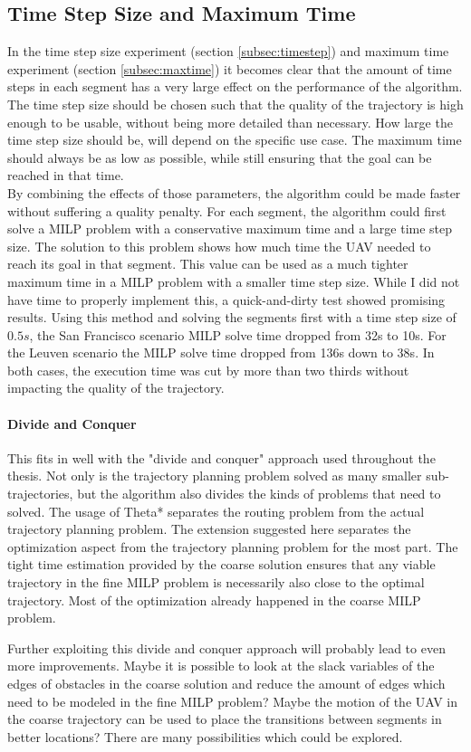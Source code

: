 \subsection{Time Step Size and Maximum Time}
In the time step size experiment (section \ref{subsec:timestep}) and maximum time experiment (section \ref{subsec:maxtime}) it becomes clear that the amount of time steps in each segment has a very large effect on the performance of the algorithm. The time step size should be chosen such that the quality of the trajectory is high enough to be usable, without being more detailed than necessary. How large the time step size should be, will depend on the specific use case. The maximum time should always be as low as possible, while still ensuring that the goal can be reached in that time. \\
By combining the effects of those parameters, the algorithm could be made faster without suffering a quality penalty. For each  segment, the algorithm could first solve a MILP problem with a conservative maximum time and a large time step size. The solution to this problem shows how much time the UAV needed to reach its goal in that segment. This value can be used as a much tighter maximum time in a MILP problem with a smaller time step size. While I did not have time to properly implement this, a quick-and-dirty test showed promising results.  Using this method and solving the segments first with a time step size of $0.5s$, the San Francisco scenario MILP solve time dropped from 32s to 10s. For the Leuven scenario the MILP solve time dropped from  136s down to 38s. In both cases, the execution time was cut by more than two thirds without impacting the quality of the trajectory.
\paragraph{Divide and Conquer}
This fits in well with the "divide and conquer" approach used throughout the thesis. Not only is the trajectory planning problem solved as many smaller sub-trajectories, but the algorithm also divides the kinds of problems that need to solved. The usage of Theta* separates the routing problem from the actual trajectory planning problem. The extension suggested here separates the optimization aspect from the trajectory planning problem for the most part. The tight time estimation provided by the coarse solution ensures that any viable trajectory in the fine MILP problem is necessarily also close to the optimal trajectory. Most of the optimization already happened in the coarse MILP problem.
\par
Further exploiting this divide and conquer approach will probably lead to even more improvements. Maybe it is possible to look at the slack variables of the edges of obstacles in the coarse solution and reduce the amount of edges which need to be modeled in the fine MILP problem? Maybe the motion of the UAV in the coarse trajectory can be used to place the transitions between segments in better locations? There are many possibilities which could be explored.


